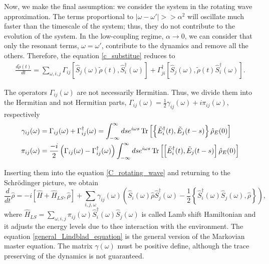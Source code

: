 Now, we make the final assumption: we consider the system in the rotating wave approximation. The terms proportional to $|\omega-\omega'| >> \alpha^2$ will oscillate much faster than the timescale of the system; thus, they do not contribute to the evolution of the system. In the low-coupling regime, $\alpha\rightarrow 0$, we can consider that only the resonant terms, $\omega=\omega'$, contribute to the dynamics and remove all the others. Therefore, the equation \eqref{c_substitue} reduces to
\begin{eqnarray}\label{C_rotating_wave}
    \frac{d\tilde\rho(t)}{dt} = \sum_{\omega,i,j}\Gamma_{ij}\left[\hat S_j(\omega)\tilde\rho(t),\hat S_i^\dagger(\omega)\right]+\Gamma_{ji}^\dagger\left[\hat S_j(\omega),\tilde\rho(t)\hat S_i^\dagger(\omega)\right].
\end{eqnarray}

The operators $\Gamma_{ij}(\omega)$ are not necessarily Hermitian. Thus, we divide them into the Hermitian and not Hermitian parts, $\Gamma_{ij}(\omega) =\frac{1}{2}\gamma_{ij}(\omega)+i\pi_{ij}(\omega)$, respectively
\begin{equation}
    \begin{split}
        \gamma_{ij}(\omega) &=   \Gamma_{ij}(\omega) + \Gamma_{ij}^\dagger(\omega) = \int_{-\infty}^\infty ds e^{i\omega s}\operatorname{Tr}\left[\left\{\tilde E_i^\dagger(t),\tilde E_j(t-s)\right\}\hat\rho_E(0)\right]\\
        \pi_{ij}(\omega) &= \frac{-i}{2}\left(\Gamma_{ij}(\omega)-\Gamma_{ij}^\dagger(\omega)\right)\int_{-\infty}^\infty ds e^{i\omega s}\operatorname{Tr}\left[\left[\tilde E_i^\dagger(t),\tilde E_j(t-s)\right]\hat\rho_E(0)\right]\\
    \end{split}
\end{equation}

Inserting them into the equation \eqref{C_rotating_wave} and returning to the Schrödinger picture, we obtain
\begin{equation}\label{general_Lindblad_equation}
    \frac{d}{dt}\hat\rho = -i\left[\hat H + \hat H_{LS},\hat\rho\right] + \sum_{i,j,\omega} \gamma_{ij}(\omega) \left(\hat S_i(\omega) \hat\rho \hat S^\dagger_j(\omega) - \frac{1}{2}\left\{ \hat S^\dagger_i(\omega)\hat S_j(\omega), \hat\rho\right\} \right),
\end{equation}
where $\hat H_{LS} = \sum_{\omega,i,j} \pi_{ij}(\omega)\hat S^\dagger_i(\omega)\hat S_j(\omega)$ is called Lamb shift Hamiltonian and it adjusts the energy levels due to thee interaction with the environment. The equation \eqref{general_Lindblad_equation} is the general version of the Markovian master equation. The matrix $\gamma(\omega)$ must be positive define, although the trace preserving of the dynamics is not guaranteed.

